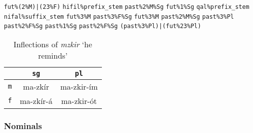 \texttt{fut\%(2\%M)|(23\%F)}
\texttt{hifil\%prefix\_stem}
\texttt{past\%2\%M\%Sg}
\texttt{fut\%1\%Sg}
\texttt{qal\%prefix\_stem}
\texttt{nifal\%suffix\_stem}
\texttt{fut\%3\%M}
\texttt{past\%3\%F\%Sg}
\texttt{fut\%3\%M}
\texttt{past\%2\%M\%Sg}
\texttt{past\%3\%Pl}
\texttt{past\%2\%F\%Sg}
\texttt{past\%1\%Sg}
\texttt{past\%2\%F\%Sg}
\texttt{(past\%3\%Pl)|(fut\%23\%Pl)}

      \begin{table}[h!]
      \small
      \begin{center}
      \begin{tabular}{ccc}
      \toprule
       & \texttt{sg} & \texttt{pl} \\
      \midrule
      \texttt{m} & ma-zk\'{i}r & ma-zkir-\'{i}m \\
      \hline
      \texttt{f} & ma-zk\'{i}r-\'{a} & ma-zkir-\'{o}t \\
      \bottomrule
      \end{tabular}
      \end{center}
      \label{tab:hifil-part}
      \caption{Inflections of {\textit{mzkir}  `he reminds'}}
    \end{table}
    


 
 
\subsubsection{Nominals}

